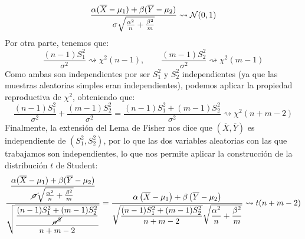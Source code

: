 \begin{ejercicio}
\begin{equation*}
        \dfrac{\alpha(\overline{X}-\mu_1 ) +\beta(\overline{Y}-\mu_2) }{\sigma\sqrt{\frac{\alpha^2}{n}+\frac{\beta^2}{m}}} \rightsquigarrow\mathcal{N}(0,1)
    \end{equation*}
    Por otra parte, tenemos que:
    \begin{equation*}
        \dfrac{(n-1)S_1^2}{\sigma^2} \rightsquigarrow\chi^2(n-1), \qquad 
        \dfrac{(m-1)S_2^2}{\sigma^2} \rightsquigarrow\chi^2(m-1) 
    \end{equation*}
    Como ambas son independientes por ser $S_1^2$ y $S_2^2$ independientes (ya que las muestras aleatorias simples eran independientes), podemos aplicar la propiedad reproductiva de $\chi^2$, obteniendo que:
    \begin{equation*}
        \dfrac{(n-1)S_1^2}{\sigma^2} + \dfrac{(m-1)S_2^2}{\sigma^2} = \dfrac{(n-1)S_1^2+(m-1)S_2^2}{\sigma^2}\rightsquigarrow\chi^2(n+m-2) 
    \end{equation*}
    Finalmente, la extensión del Lema de Fisher nos dice que $(\overline{X},\overline{Y})$ es independiente de $(S_1^2, S_2^2)$, por lo que las dos variables aleatorias con las que trabajamos son independientes, lo que nos permite aplicar la construcción de la distribución $t$ de Student:
    \begin{equation*}
        \dfrac{\dfrac{\alpha(\overline{X}-\mu_1 ) +\beta(\overline{Y}-\mu_2) }{\cancel{\sigma}\sqrt{\frac{\alpha^2}{n}+\frac{\beta^2}{m}}}}{\sqrt{\dfrac{\dfrac{(n-1)S_1^2+(m-1)S_2^2}{\cancel{\sigma^2}}}{n+m-2}}} = \dfrac{\alpha\left(\overline{X}-\mu_1\right)+\beta\left(\overline{Y}-\mu_2\right)}{\sqrt{\dfrac{(n-1)S_1^2 + (m-1)S_2^2}{n+m-2}} \sqrt{\dfrac{\alpha^2}{n} + \dfrac{\beta^2}{m}}} \rightsquigarrow t(n+m-2)
    \end{equation*}
\end{ejercicio}

